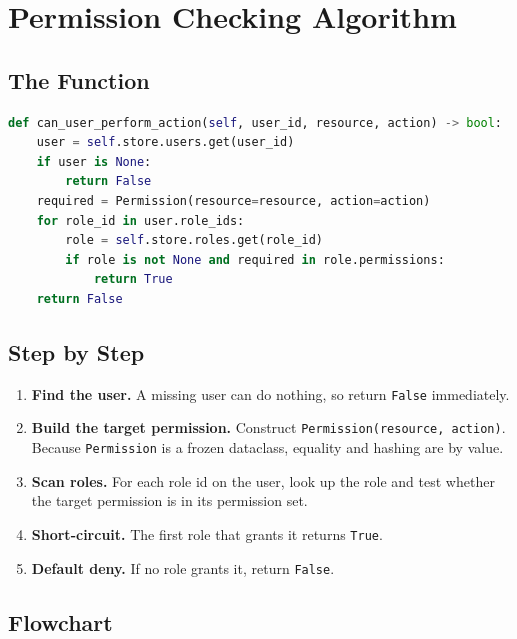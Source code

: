 \documentclass[11pt,a4paper]{report}
\begin{document}
\chapter{Permission Checking Algorithm}

\section{The Function}

\begin{lstlisting}[language=Python]
def can_user_perform_action(self, user_id, resource, action) -> bool:
    user = self.store.users.get(user_id)
    if user is None:
        return False
    required = Permission(resource=resource, action=action)
    for role_id in user.role_ids:
        role = self.store.roles.get(role_id)
        if role is not None and required in role.permissions:
            return True
    return False
\end{lstlisting}

\section{Step by Step}

\begin{enumerate}[leftmargin=1.6em]
  \item \textbf{Find the user.} A missing user can do nothing, so return
        \texttt{False} immediately.
  \item \textbf{Build the target permission.} Construct
        \texttt{Permission(resource, action)}. Because \texttt{Permission} is a
        frozen dataclass, equality and hashing are by value.
  \item \textbf{Scan roles.} For each role id on the user, look up the role and
        test whether the target permission is in its permission set.
  \item \textbf{Short-circuit.} The first role that grants it returns
        \texttt{True}.
  \item \textbf{Default deny.} If no role grants it, return \texttt{False}.
\end{enumerate}

\section{Flowchart}
\end{document}
